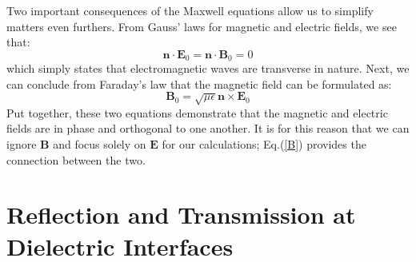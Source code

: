 \documentclass[preprint, onecolumn, amsmath, amssymb, aps]{revtex4-1}
\numberwithin{equation}{section}
\begin{document}
Two important consequences of the Maxwell equations allow us to simplify matters even furthers. From Gauss' laws for magnetic and electric fields, we see that:
\begin{equation}
\mathbf{n} \cdot \mathbf{E}_{0} = \mathbf{n} \cdot \mathbf{B}_{0} = 0
\end{equation}
\noindent
which simply states that electromagnetic waves are transverse in nature. Next, we can conclude from Faraday's law that the magnetic field can be formulated as:  
\begin{equation}\label{B}
\mathbf{B}_{0} = \sqrt{\mu \epsilon} \mathbf{n} \times \mathbf{E}_{0}
\end{equation}
\noindent
Put together, these two equations demonstrate that the magnetic and electric fields are in phase and orthogonal to one another. It is for this reason that we can ignore $\mathbf{B}$ and focus solely on $\mathbf{E}$ for our calculations; Eq.(\ref{B}) provides the connection between the two. \\

\section{Reflection and Transmission at Dielectric Interfaces}
\end{document}
